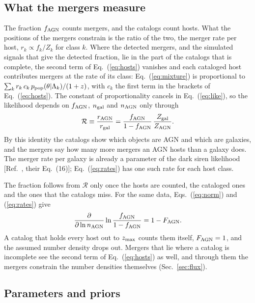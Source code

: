 \documentclass[aps,prd,reprint,twocolumn,superscriptaddress,nofootinbib,floatfix,nolongbibliography]{revtex4-2}
\newcommand{\fagn}{f_{\rm AGN}}
\newcommand{\ngal}{n_{\rm gal}}
\newcommand{\nagn}{n_{\rm AGN}}
\newcommand{\rr}{\mathcal{R}}
\begin{document}
\subsection{What the mergers measure}
\label{sec:rates}

The fraction $\fagn$ counts mergers, and the catalogs count hosts. What the
positions of the mergers constrain is the ratio of the two, the merger rate
per host, $r_k\propto f_k/Z_k$ for class $k$. Where the detected mergers, and
the simulated signals that give the detected fraction, lie in the part of
the catalogs that is complete, the second term of Eq.~(\ref{eq:hosts})
vanishes and each cataloged host contributes mergers at the rate of its
class: Eq.~(\ref{eq:mixture}) is proportional to $\sum_k r_k\,c_k\,p_{\rm
pop}(\theta|\Lambda_k)/(1+z)$, with $c_k$ the first term in the brackets of
Eq.~(\ref{eq:hosts}). The constant of proportionality cancels in
Eq.~(\ref{eq:like}), so the likelihood depends on $\fagn$, $\ngal$ and
$\nagn$ only through
\begin{equation}
\rr\equiv\frac{r_{\rm AGN}}{r_{\rm gal}}=\frac{\fagn}{1-\fagn}\,
\frac{Z_{\rm gal}}{Z_{\rm AGN}} .
\label{eq:rates}
\end{equation}
By this identity the catalogs show which objects are AGN and which are
galaxies, and the mergers say how many more mergers an AGN hosts than a
galaxy does. The merger
rate per galaxy is already a parameter of the dark siren likelihood
[Ref.~\cite{Mastrogiovanni:2023emh}, their Eq.~(16)];
Eq.~(\ref{eq:rates}) has one such rate for each host class.

The fraction follows from $\rr$ only once the hosts are counted, the
cataloged ones and the ones that the catalogs miss. For the same data,
Eqs.~(\ref{eq:norm}) and (\ref{eq:rates}) give
\begin{equation}
\frac{\partial}{\partial\ln\nagn}\ln\frac{\fagn}{1-\fagn}=1-F_{\rm AGN} .
\label{eq:slope}
\end{equation}
A catalog that holds every host out to $z_{\rm max}$ counts them itself,
$F_{\rm AGN}=1$, and the assumed number density drops out. Mergers that lie where a catalog is incomplete see the second term
of Eq.~(\ref{eq:hosts}) as well, and through them the mergers constrain the
number densities themselves (Sec.~\ref{sec:flux}).

\subsection{Parameters and priors}
\label{sec:priors}
\end{document}
